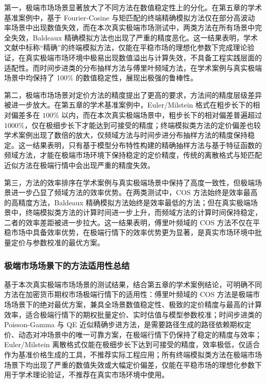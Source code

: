 第一，极端市场场景显著放大了不同方法在数值稳定性上的分化。在第五章的学术基准案例中，基于 Fourier-Cosine 与矩匹配的终端精确模拟方法仅在部分高波动率场景中出现数值失效，而在本次真实极端市场测试中，两类方法在所有场景中完全失效，Baldeaux 精确模拟方法也出现了严重的精度恶化。这一结果表明，学术文献中标称“精确”的终端模拟方法，仅能在平稳市场的理想化参数下完成理论验证，在真实极端市场环境中极易出现数值溢出与计算失效，不具备工程实践层面的适配性。而时间步进类的分布抽样方法与傅里叶频域方法，在学术案例与真实极端场景中均保持了 100\% 的数值稳定性，展现出极强的鲁棒性。

第二，极端市场场景对定价方法的精度提出了更高的要求，方法间的精度层级差异被进一步放大。在第五章的学术基准案例中，Euler/Milstein 格式在粗步长下的相对偏差多在 $100\%$ 以内，而在本次真实极端场景中，粗步长下的相对偏差普遍超过 $1000\%$，仅在极细步长下才能达到可接受的精度；终端模拟类方法的定价偏差也较学术案例出现了数倍的放大，仅频域方法与时间步进分布抽样方法的精度保持稳定。这一结果表明，只有基于模型分布特性构建的精确抽样方法与基于特征函数的频域方法，才能在极端市场环境下保持稳定的定价精度，传统的离散格式与矩匹配近似方法在极端行情中会出现严重的精度失效。

第三，方法的效率排序在学术案例与真实极端场景中保持了高度一致性，但极端场景进一步凸显了频域方法的效率优势。在两类测试中，COS 方法始终是效率最高的高精度方法，Baldeaux 精确模拟方法始终是效率最低的方法；但在真实极端场景中，终端模拟类方法的计算时间进一步上升，而频域方法的计算时间保持稳定，二者的效率差距被进一步拉大。这一结果表明，傅里叶频域的 COS 方法不仅在平稳市场中具备效率优势，在极端行情下的效率优势更为显著，是真实市场环境中批量定价与参数校准的最优方案。

\subsubsection{极端市场场景下的方法适用性总结}
基于本次真实极端市场场景的测试结果，结合第五章的学术案例结论，可明确不同方法在加密货币期权市场极端行情下的适用性：傅里叶频域的 COS 方法是极端市场场景下的绝对最优方案，兼具全场景数值稳定性、极致的定价精度与最高的计算效率，适合极端行情下的期权批量定价、实时估值与模型参数校准；时间步进类的 Poisson-Gamma 与 QE 近似精确步进方法，是需要路径生成的路径依赖期权定价、动态对冲场景中的唯一可靠方案，在极端行情下仍保持了稳定的精度与效率；Euler/Milstein 离散格式仅能在极细步长下达到可接受的精度，效率极低，仅适合作为基准价格生成的工具，不推荐实际工程应用；所有终端模拟类方法在极端市场场景下均出现了严重的数值失效或大幅定价偏差，仅能在平稳市场的理想化参数下用于学术理论验证，不推荐在真实市场环境中使用。

